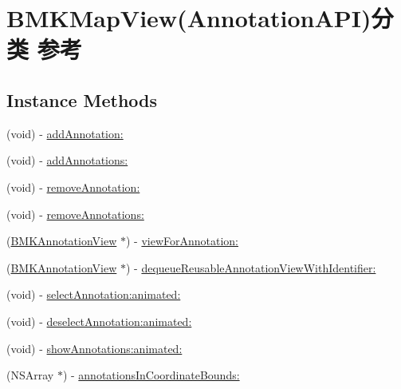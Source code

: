 \hypertarget{category_b_m_k_map_view_07_annotation_a_p_i_08}{}\section{B\+M\+K\+Map\+View(Annotation\+A\+P\+I)分类 参考}
\label{category_b_m_k_map_view_07_annotation_a_p_i_08}
\subsection*{Instance Methods}
\begin{DoxyCompactItemize}
\item 
(void) -\/ \hyperlink{category_b_m_k_map_view_07_annotation_a_p_i_08_a2af9ed45c3a7fd530dd414dc573327b3}{add\+Annotation\+:}
\item 
(void) -\/ \hyperlink{category_b_m_k_map_view_07_annotation_a_p_i_08_affd032313c55ae27814430b760e4aea0}{add\+Annotations\+:}
\item 
(void) -\/ \hyperlink{category_b_m_k_map_view_07_annotation_a_p_i_08_a6b6b75a5bf8b02854767f782a38d2009}{remove\+Annotation\+:}
\item 
(void) -\/ \hyperlink{category_b_m_k_map_view_07_annotation_a_p_i_08_a37fbe2b5db750affb4e0234cbf24a3c7}{remove\+Annotations\+:}
\item 
(\hyperlink{interface_b_m_k_annotation_view}{B\+M\+K\+Annotation\+View} $\ast$) -\/ \hyperlink{category_b_m_k_map_view_07_annotation_a_p_i_08_a0fb885234188aef28df944d5f636c70c}{view\+For\+Annotation\+:}
\item 
(\hyperlink{interface_b_m_k_annotation_view}{B\+M\+K\+Annotation\+View} $\ast$) -\/ \hyperlink{category_b_m_k_map_view_07_annotation_a_p_i_08_a4d4aa7a171876f3f66add8f86cca1e8c}{dequeue\+Reusable\+Annotation\+View\+With\+Identifier\+:}
\item 
(void) -\/ \hyperlink{category_b_m_k_map_view_07_annotation_a_p_i_08_a92dbf00c3eff2ede4d4ffd485c4059e0}{select\+Annotation\+:animated\+:}
\item 
(void) -\/ \hyperlink{category_b_m_k_map_view_07_annotation_a_p_i_08_a3d6bbc91bc3b66463ee97b3c909e4999}{deselect\+Annotation\+:animated\+:}
\item 
(void) -\/ \hyperlink{category_b_m_k_map_view_07_annotation_a_p_i_08_a62093e51bd52b357d909b75b4447b415}{show\+Annotations\+:animated\+:}
\item 
(N\+S\+Array $\ast$) -\/ \hyperlink{category_b_m_k_map_view_07_annotation_a_p_i_08_ac683d0d593744c75684063fe8dc9fdcd}{annotations\+In\+Coordinate\+Bounds\+:}
\end{DoxyCompactItemize}
